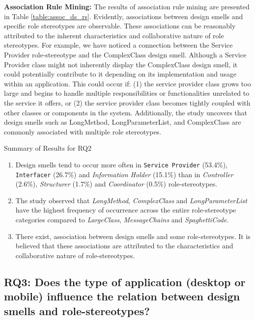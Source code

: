 \documentclass[AMA,Times1COL]{WileyNJDv5} %
\begin{document}
	\textbf{Association Rule Mining:} The results of association rule mining are presented in Table \ref{table:assoc_ds_rs}. Evidently, associations between design smells and specific role stereotypes are observable. These associations can be reasonably attributed to the inherent characteristics and collaborative nature of role stereotypes. For example, we have noticed a connection between the Service Provider role-stereotype and the ComplexClass design smell. Although a Service Provider class might not inherently display the ComplexClass design smell, it could potentially contribute to it depending on its implementation and usage within an application. This could occur if: (1) the service provider class grows too large and begins to handle multiple responsibilities or functionalities unrelated to the service it offers, or (2) the service provider class becomes tightly coupled with other classes or components in the system. Additionally, the study uncovers that design smells such as LongMethod, LongParameterList, and ComplexClass are commonly associated with multiple role stereotypes.
		\begin{boxwithhead}
		{Summary of Results for RQ2}
		{\noindent 
			\begin{enumerate}
				\item Design smells tend to occur more often in {\tt Service Provider} (53.4\%), {\tt Interfacer} (26.7\%) and \textit{Information Holder} (15.1\%) than in \textit{Controller} (2.6\%), \textit{Structurer} (1.7\%) and \textit{Coordinator} (0.5\%) role-stereotypes.
				\item The study observed that \textit{LongMethod}, \textit{ComplexClass} and \textit{LongParameterList} have the highest frequency of occurrence across the entire role-stereotype categories compared to \textit{LargeClass}, \textit{MessageChains} and \textit{SpaghettiCode}.
				\item There exist, association between design smells and some role-stereotypes. It is believed that these associations are attributed to the characteristics and collaborative nature of role-stereotypes.
			\end{enumerate}
		}
	\end{boxwithhead}
	
	\subsection*{RQ3: Does the type of application (desktop or mobile) influence the relation between design smells and role-stereotypes?}
	
\end{document}
